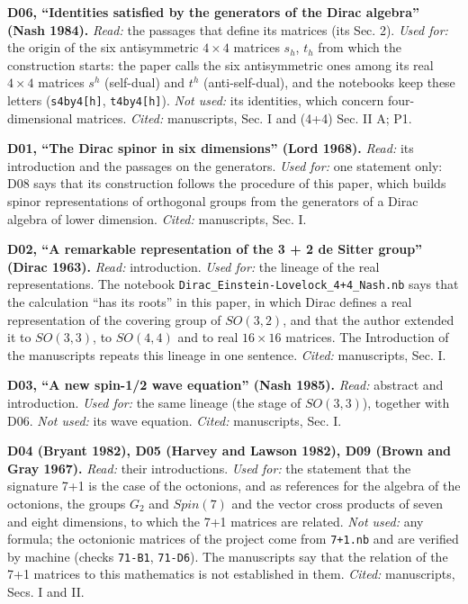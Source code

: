 \documentclass[
  10pt,
]{article}
\begin{document}
\textbf{D06, ``Identities satisfied by the generators of the Dirac
algebra'' (Nash 1984).} \emph{Read:} the passages that define its
matrices (its Sec. 2). \emph{Used for:} the origin of the six
antisymmetric \(4\times4\) matrices \(s_h\), \(t_h\) from which the
construction starts: the paper calls the six antisymmetric ones among
its real \(4\times4\) matrices \(s^h\) (self-dual) and \(t^h\)
(anti-self-dual), and the notebooks keep these letters
(\texttt{s4by4{[}h{]}}, \texttt{t4by4{[}h{]}}). \emph{Not used:} its
identities, which concern four-dimensional matrices. \emph{Cited:}
manuscripts, Sec. I and (4+4) Sec. II A; P1.

\textbf{D01, ``The Dirac spinor in six dimensions'' (Lord 1968).}
\emph{Read:} its introduction and the passages on the generators.
\emph{Used for:} one statement only: D08 says that its construction
follows the procedure of this paper, which builds spinor representations
of orthogonal groups from the generators of a Dirac algebra of lower
dimension. \emph{Cited:} manuscripts, Sec. I.

\textbf{D02, ``A remarkable representation of the 3 + 2 de Sitter
group'' (Dirac 1963).} \emph{Read:} introduction. \emph{Used for:} the
lineage of the real representations. The notebook
\texttt{Dirac\_Einstein-Lovelock\_4+4\_Nash.nb} says that the
calculation ``has its roots'' in this paper, in which Dirac defines a
real representation of the covering group of \(SO(3,2)\), and that the
author extended it to \(SO(3,3)\), to \(SO(4,4)\) and to real
\(16\times16\) matrices. The Introduction of the manuscripts repeats
this lineage in one sentence. \emph{Cited:} manuscripts, Sec. I.

\textbf{D03, ``A new spin-1/2 wave equation'' (Nash 1985).} \emph{Read:}
abstract and introduction. \emph{Used for:} the same lineage (the stage
of \(SO(3,3)\)), together with D06. \emph{Not used:} its wave equation.
\emph{Cited:} manuscripts, Sec. I.

\textbf{D04 (Bryant 1982), D05 (Harvey and Lawson 1982), D09 (Brown and
Gray 1967).} \emph{Read:} their introductions. \emph{Used for:} the
statement that the signature 7+1 is the case of the octonions, and as
references for the algebra of the octonions, the groups \(G_2\) and
\(Spin(7)\) and the vector cross products of seven and eight dimensions,
to which the 7+1 matrices are related. \emph{Not used:} any formula; the
octonionic matrices of the project come from \texttt{7+1.nb} and are
verified by machine (checks \texttt{71-B1}, \texttt{71-D6}). The
manuscripts say that the relation of the 7+1 matrices to this
mathematics is not established in them. \emph{Cited:} manuscripts, Secs.
I and II.
\end{document}
